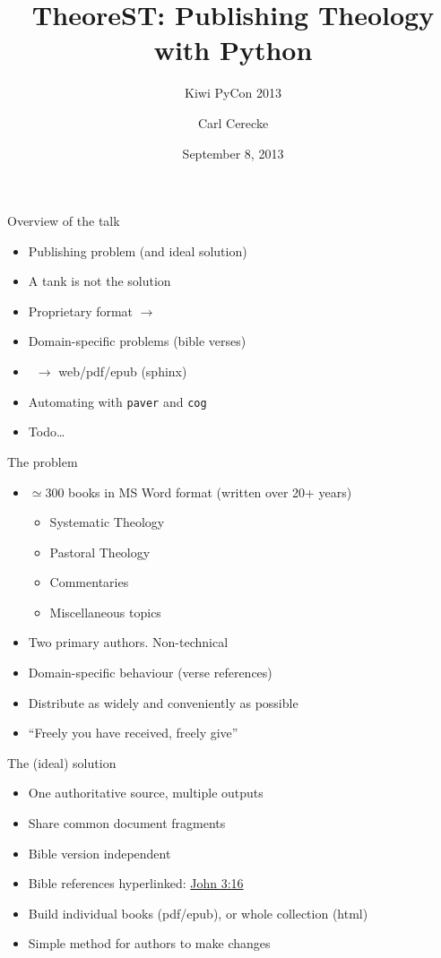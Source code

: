 \documentclass{beamer}
\title{TheoreST: Publishing Theology with Python}
\subtitle{Kiwi PyCon 2013}
\author{Carl Cerecke}
\institute{Evangelical Bible College of Western Australia}
\date{September 8, 2013}
\begin{document}
    \begin{frame}[plain]
        \titlepage
    \end{frame}

\begin{frame}{Overview of the talk}
    \begin{itemize}
    \item Publishing problem (and ideal solution)
    \item A tank is not the solution
    \item Proprietary format $\rightarrow$ \rst
    \item Domain-specific problems (bible verses)
    \item \rst\ $\rightarrow$ web/pdf/epub (sphinx)
    \item Automating with \texttt{paver} and \texttt{cog}
    \item Todo\ldots
    \end{itemize}
\end{frame}
    
\begin{frame}{The problem}
    \begin{itemize}
    \item $\simeq$300 books in MS Word format (written over 20+ years)
        \begin{itemize}
        \item Systematic Theology
        \item Pastoral Theology
        \item Commentaries
        \item Miscellaneous topics 
        \end{itemize}
    \item Two primary authors. Non-technical
    \item Domain-specific behaviour (verse references)
    \item Distribute as widely and conveniently as possible
    \item ``Freely you have received, freely give''
    \end{itemize}
\end{frame}
    
\begin{frame}{The (ideal) solution}
\begin{itemize}
    \item One authoritative source, multiple outputs
    \item Share common document fragments
    \item Bible version independent
    \item Bible references hyperlinked: \href{http://some.url}{John 3:16}
    \item Build individual books (pdf/epub), or whole collection (html)
    \item Simple method for authors to make changes
\end{itemize}
\end{frame}
\end{document}
